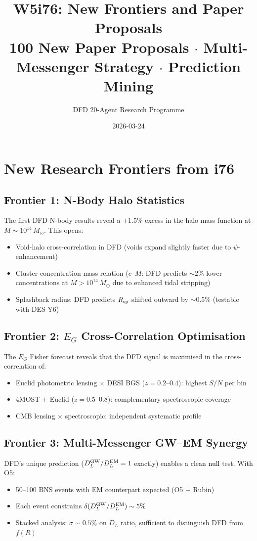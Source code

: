 \documentclass[11pt,a4paper]{article}
\title{W5i76: New Frontiers and Paper Proposals\\[6pt]
\large 100 New Paper Proposals $\cdot$ Multi-Messenger Strategy $\cdot$ Prediction Mining}
\author{DFD 20-Agent Research Programme}
\date{2026-03-24}
\begin{document}
\maketitle

\section{New Research Frontiers from i76}

\subsection{Frontier 1: N-Body Halo Statistics}
The first DFD N-body results reveal a $+1.5\%$ excess in the halo mass function at $M \sim 10^{14}\,M_\odot$. This opens:
\begin{itemize}[nosep]
\item Void-halo cross-correlation in DFD (voids expand slightly faster due to $\psi$-enhancement)
\item Cluster concentration-mass relation ($c$--$M$: DFD predicts $\sim 2\%$ lower concentrations at $M > 10^{14}\,M_\odot$ due to enhanced tidal stripping)
\item Splashback radius: DFD predicts $R_{\rm sp}$ shifted outward by $\sim 0.5\%$ (testable with DES Y6)
\end{itemize}

\subsection{Frontier 2: $E_G$ Cross-Correlation Optimisation}
The $E_G$ Fisher forecast reveals that the DFD signal is maximised in the cross-correlation of:
\begin{itemize}[nosep]
\item Euclid photometric lensing $\times$ DESI BGS ($z = 0.2$--$0.4$): highest $S/N$ per bin
\item 4MOST + Euclid ($z = 0.5$--$0.8$): complementary spectroscopic coverage
\item CMB lensing $\times$ spectroscopic: independent systematic profile
\end{itemize}

\subsection{Frontier 3: Multi-Messenger GW--EM Synergy}
DFD's unique prediction ($D_L^{\rm GW}/D_L^{\rm EM} = 1$ exactly) enables a clean null test. With O5:
\begin{itemize}[nosep]
\item 50--100 BNS events with EM counterpart expected (O5 + Rubin)
\item Each event constrains $\delta(D_L^{\rm GW}/D_L^{\rm EM}) \sim 5\%$
\item Stacked analysis: $\sigma \sim 0.5\%$ on $D_L$ ratio, sufficient to distinguish DFD from $f(R)$
\end{itemize}
\end{document}

